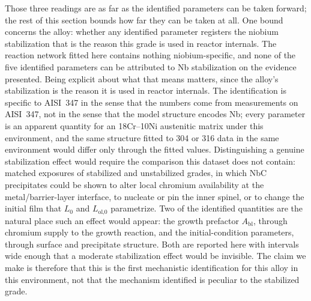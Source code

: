 \documentclass[pdflatex,sn-nature]{sn-jnl}
\begin{document}
Those three readings are as far as the identified parameters can be
taken forward; the rest of this section bounds how far they can be taken
at all. One bound concerns the alloy: whether any identified
parameter registers the niobium stabilization that is the reason this
grade is used in reactor internals. The reaction network fitted here
contains nothing niobium-specific, and none of the five identified
parameters can be attributed to Nb stabilization on the evidence
presented. Being explicit about what that means matters, since the
alloy's stabilization is the reason it is used in reactor internals. The
identification is specific to AISI~347 in the sense that the numbers
come from measurements on AISI~347, not in the sense that the model
structure encodes Nb; every parameter is an apparent quantity for an
18Cr--10Ni austenitic matrix under this environment, and the same
structure fitted to 304 or 316 data in the same environment would differ
only through the fitted values. Distinguishing a genuine stabilization
effect would require the comparison this dataset does not contain:
matched exposures of stabilized and unstabilized grades, in which NbC
precipitates could be shown to alter local chromium availability at the
metal/barrier-layer interface, to nucleate or pin the inner spinel, or
to change the initial film that $L_0$ and $L_\text{ol,0}$ parametrize.
Two of the identified quantities are the natural place such an effect
would appear: the growth prefactor $A_\text{bl}$, through chromium
supply to the growth reaction, and the initial-condition parameters,
through surface and precipitate structure. Both are reported here with
intervals wide enough that a moderate stabilization effect would be
invisible. The claim we make is therefore that this is the first
mechanistic identification for this alloy in this environment, not that
the mechanism identified is peculiar to the stabilized grade.
\end{document}
